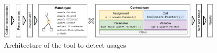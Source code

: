 \begin{figure}[htp!]
    \centering
    \includegraphics[width=\textwidth]{assets/figures/chapter4/go-geiger-architecture.pdf}
    \caption{Architecture of the \toolGeiger{} tool to detect \unsafe{} usages}
    \label{fig:go-geiger-architecture}
\end{figure}

